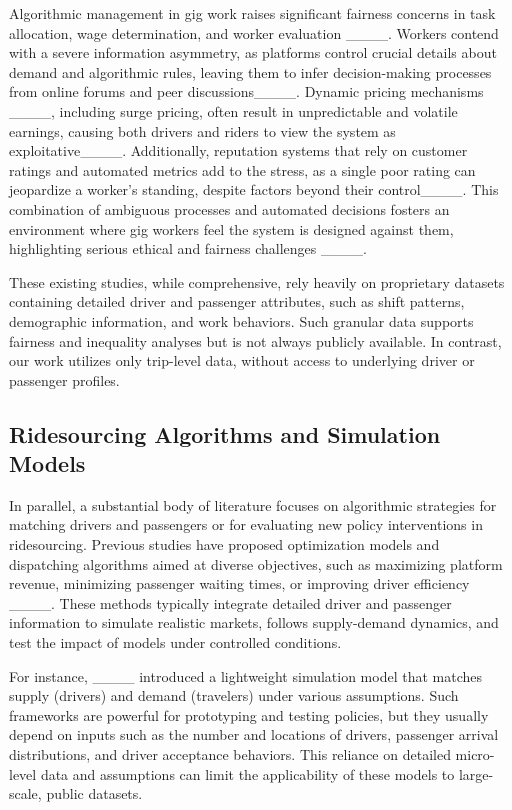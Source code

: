 Algorithmic management in gig work raises significant fairness concerns in task allocation, wage determination, and worker evaluation ____. Workers contend with a severe information asymmetry, as platforms control crucial details about demand and algorithmic rules, leaving them to infer decision-making processes from online forums and peer discussions____. Dynamic pricing mechanisms ____, including surge pricing, often result in unpredictable and volatile earnings, causing both drivers and riders to view the system as exploitative____. Additionally, reputation systems that rely on customer ratings and automated metrics add to the stress, as a single poor rating can jeopardize a worker’s standing, despite factors beyond their control____. This combination of ambiguous processes and automated decisions fosters an environment where gig workers feel the system is designed against them, highlighting serious ethical and fairness challenges ____.


These existing studies, while comprehensive, rely heavily on proprietary datasets containing detailed driver and passenger attributes, such as shift patterns, demographic information, and work behaviors. Such granular data supports fairness and inequality analyses but is not always publicly available. In contrast, our work utilizes only trip-level data, without access to underlying driver or passenger profiles.

\subsection{Ridesourcing Algorithms and Simulation Models}

In parallel, a substantial body of literature focuses on algorithmic strategies for matching drivers and passengers or for evaluating new policy interventions in ridesourcing. Previous studies have proposed optimization models and dispatching algorithms aimed at diverse objectives, such as maximizing platform revenue, minimizing passenger waiting times, or improving driver efficiency ____. These methods typically integrate detailed driver and passenger information to simulate realistic markets, follows supply-demand dynamics, and test the impact of models under controlled conditions.

For instance, ____ introduced a lightweight simulation model that matches supply (drivers) and demand (travelers) under various assumptions. Such frameworks are powerful for prototyping and testing policies, but they usually depend on inputs such as the number and locations of drivers, passenger arrival distributions, and driver acceptance behaviors. This reliance on detailed micro-level data and assumptions can limit the applicability of these models to large-scale, public datasets.


